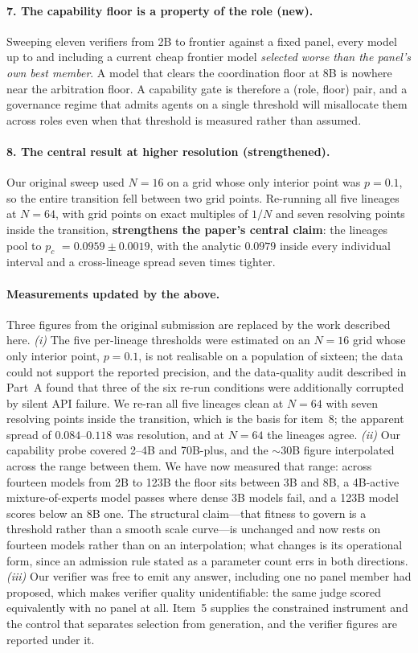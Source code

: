 \documentclass[11pt,a4paper]{article}
\newcommand{\pc}{$p_c$}
\begin{document}
\paragraph{7. The capability floor is a property of the role (new).}
Sweeping eleven verifiers from 2B to frontier against a fixed panel, every model up
to and including a current cheap frontier model \emph{selected worse than the
panel's own best member}. A model that clears the coordination floor at 8B is
nowhere near the arbitration floor. A capability gate is therefore a (role, floor)
pair, and a governance regime that admits agents on a single threshold will
misallocate them across roles even when that threshold is measured rather than
assumed.

\paragraph{8. The central result at higher resolution (strengthened).}
Our original sweep used $N=16$ on a grid whose only interior point was $p=0.1$, so
the entire transition fell between two grid points. Re-running all five lineages at
$N=64$, with grid points on exact multiples of $1/N$ and seven resolving points
inside the transition, \textbf{strengthens the paper's central claim}: the lineages
pool to \pc{} $=0.0959 \pm 0.0019$, with the analytic $0.0979$ inside every
individual interval and a cross-lineage spread seven times tighter.

\paragraph{Measurements updated by the above.}
Three figures from the original submission are replaced by the work described here.
\emph{(i)} The five per-lineage thresholds were estimated on an $N=16$ grid whose
only interior point, $p=0.1$, is not realisable on a population of sixteen; the data
could not support the reported precision, and the data-quality audit described in
Part~A found that three of the six re-run conditions were additionally corrupted by
silent API failure. We re-ran all five lineages clean at $N=64$ with seven resolving
points inside the transition, which is the basis for item~8; the apparent spread of
$0.084$--$0.118$ was resolution, and at $N=64$ the lineages agree. \emph{(ii)} Our
capability probe covered 2--4B and 70B-plus, and the ${\sim}30$B figure interpolated
across the range between them. We have now measured that range: across fourteen
models from 2B to 123B the floor sits between 3B and 8B, a 4B-active
mixture-of-experts model passes where dense 3B models fail, and a 123B model scores
below an 8B one. The structural claim---that fitness to govern is a threshold rather
than a smooth scale curve---is unchanged and now rests on fourteen models rather than
on an interpolation; what changes is its operational form, since an admission rule
stated as a parameter count errs in both directions. \emph{(iii)} Our verifier was
free to emit any answer, including one no panel member had proposed, which makes
verifier quality unidentifiable: the same judge scored equivalently with no panel at
all. Item~5 supplies the constrained instrument and the control that separates
selection from generation, and the verifier figures are reported under it.
\end{document}
